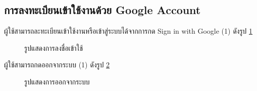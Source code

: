 \subsection{การลงทะเบียนเข้าใช้งานด้วย Google Account}
ผู้ใช้สามารถละทะเบียนเข้าใช้งานหรือเข้าสู่ระบบได้จากการกด Sign in with Google (1) ดังรูป \ref{fig:login-CP}
\begin{figure}[H]\centering
    \caption{รูปแสดงการลงชื่อเข้าใช้}\label{fig:login-CP}
\end{figure}
ผู้ใช้สามารถกดออกจากระบบ (1) ดังรูป \ref{fig:logout-CP}
\begin{figure}[H]\centering
    \caption{รูปแสดงการออกจากระบบ}\label{fig:logout-CP}
\end{figure}